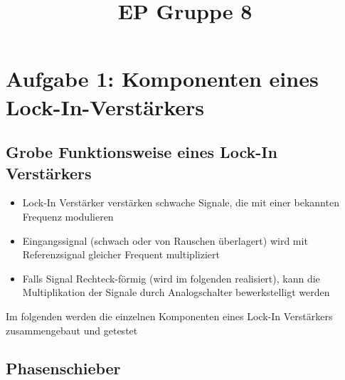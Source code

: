 \documentclass[compress,11pt]{beamer}
\title{EP Gruppe 8}
\begin{document}
\section{Aufgabe 1: Komponenten eines Lock-In-Verstärkers}
\subsection{Grobe Funktionsweise eines Lock-In Verstärkers}
\begin{frame}
\begin{block}
\begin{itemize}
\item Lock-In Verstärker verstärken schwache Signale, die mit einer bekannten Frequenz modulieren
\item Eingangssignal (schwach oder von Rauschen überlagert) wird mit Referenzsignal gleicher Frequent multipliziert
\item Falls Signal Rechteck-förmig (wird im folgenden realisiert), kann die Multiplikation der Signale durch Analogschalter bewerkstelligt werden
\end{itemize}
\end{block}
Im folgenden werden die einzelnen Komponenten eines Lock-In Verstärkers zusammengebaut und getestet
\end{frame}
\subsection{Phasenschieber}
\end{document}
